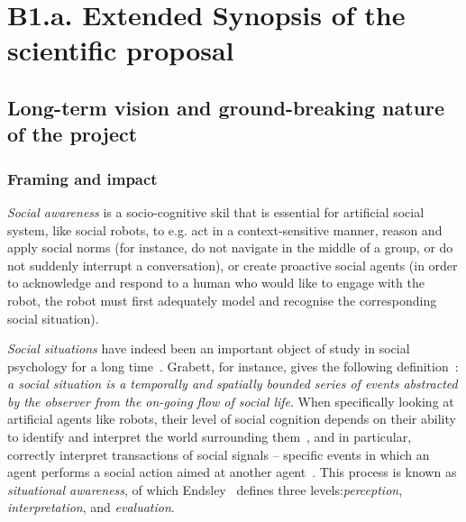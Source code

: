 
\newrefsection


\chapter{B1.a. Extended Synopsis of the scientific proposal}\label{part1}



\section{Long-term vision and ground-breaking nature of the project}

\subsection{Framing and impact}

\emph{Social awareness} is a socio-cognitive skil that is essential for
artificial social system, like social robots, to e.g.  act in a
context-sensitive manner, reason and apply social norms (for instance, do not
navigate in the middle of a group, or do not suddenly interrupt a conversation),
or create proactive social agents (in order to acknowledge and respond to a
human who would like to engage with the robot, the robot must first adequately
model and recognise the corresponding social situation).

\emph{Social situations} have indeed been an important object of study in social
psychology for a long time~\cite{argyle1981social}. Grabett, for instance, gives
the following definition~\cite{grabett1970analysis}: \emph{a social situation is
a temporally and spatially bounded series of events abstracted by the observer
from the on-going flow of social life}. When specifically looking at artificial
agents like robots, their level of social cognition depends on their ability to
identify and interpret the world surrounding them~\cite{szczepanowski2017}, and
in particular, correctly interpret transactions of social signals -- specific
events in which an agent performs a social action aimed at another
agent~\cite{pantic2011}. This process is known as \textit{situational
awareness}, of which Endsley~\cite{endsley1995} defines three
levels:\emph{perception}, \emph{interpretation}, and \emph{evaluation}.

